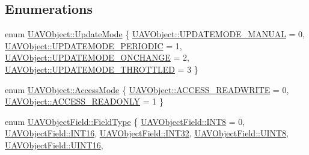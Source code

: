 \subsection*{\-Enumerations}
\begin{DoxyCompactItemize}
\item 
enum \hyperlink{group___u_a_v_objects_plugin_ga08c0580992fcd51c2b44734e2d24cac6}{\-U\-A\-V\-Object\-::\-Update\-Mode} \{ \hyperlink{group___u_a_v_objects_plugin_gga08c0580992fcd51c2b44734e2d24cac6a7e761571cc6ee4432fa664f23fcb7032}{\-U\-A\-V\-Object\-::\-U\-P\-D\-A\-T\-E\-M\-O\-D\-E\-\_\-\-M\-A\-N\-U\-A\-L} =  0, 
\hyperlink{group___u_a_v_objects_plugin_gga08c0580992fcd51c2b44734e2d24cac6a6057e8a8af67f00940fad6f62499b843}{\-U\-A\-V\-Object\-::\-U\-P\-D\-A\-T\-E\-M\-O\-D\-E\-\_\-\-P\-E\-R\-I\-O\-D\-I\-C} =  1, 
\hyperlink{group___u_a_v_objects_plugin_gga08c0580992fcd51c2b44734e2d24cac6a118268aa016a1f371149d6180bd9a366}{\-U\-A\-V\-Object\-::\-U\-P\-D\-A\-T\-E\-M\-O\-D\-E\-\_\-\-O\-N\-C\-H\-A\-N\-G\-E} =  2, 
\hyperlink{group___u_a_v_objects_plugin_gga08c0580992fcd51c2b44734e2d24cac6aea4380a186f544bd364259d2e436fb75}{\-U\-A\-V\-Object\-::\-U\-P\-D\-A\-T\-E\-M\-O\-D\-E\-\_\-\-T\-H\-R\-O\-T\-T\-L\-E\-D} =  3
 \}
\item 
enum \hyperlink{group___u_a_v_objects_plugin_ga80357a2f38fa4be23200de86614c3d77}{\-U\-A\-V\-Object\-::\-Access\-Mode} \{ \hyperlink{group___u_a_v_objects_plugin_gga80357a2f38fa4be23200de86614c3d77ad710c074e7e275da805bf900c9917d47}{\-U\-A\-V\-Object\-::\-A\-C\-C\-E\-S\-S\-\_\-\-R\-E\-A\-D\-W\-R\-I\-T\-E} =  0, 
\hyperlink{group___u_a_v_objects_plugin_gga80357a2f38fa4be23200de86614c3d77a97e59f527995175cc60e103001470e49}{\-U\-A\-V\-Object\-::\-A\-C\-C\-E\-S\-S\-\_\-\-R\-E\-A\-D\-O\-N\-L\-Y} =  1
 \}
\item 
enum \hyperlink{group___u_a_v_objects_plugin_ga74498368bc91f3ed74beacb096744cf3}{\-U\-A\-V\-Object\-Field\-::\-Field\-Type} \{ \*
\hyperlink{group___u_a_v_objects_plugin_gga74498368bc91f3ed74beacb096744cf3a19e2840fa94a77e0e4d6bcf7fb40e734}{\-U\-A\-V\-Object\-Field\-::\-I\-N\-T8} =  0, 
\hyperlink{group___u_a_v_objects_plugin_gga74498368bc91f3ed74beacb096744cf3a449ba7536fca8720c9608dd26c74182a}{\-U\-A\-V\-Object\-Field\-::\-I\-N\-T16}, 
\hyperlink{group___u_a_v_objects_plugin_gga74498368bc91f3ed74beacb096744cf3ad47a62cf1ae89582cb875a6bc59662ec}{\-U\-A\-V\-Object\-Field\-::\-I\-N\-T32}, 
\hyperlink{group___u_a_v_objects_plugin_gga74498368bc91f3ed74beacb096744cf3a6546a8ed8b8449d2829291856d3f8e5d}{\-U\-A\-V\-Object\-Field\-::\-U\-I\-N\-T8}, 
\*
\hyperlink{group___u_a_v_objects_plugin_gga74498368bc91f3ed74beacb096744cf3ac2f59f65ccf56a9b5ab9537f243d8ebb}{\-U\-A\-V\-Object\-Field\-::\-U\-I\-N\-T16}, 

\end{DoxyCompactItemize}
